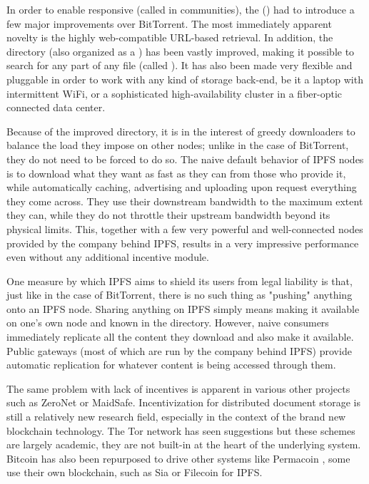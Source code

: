 In order to enable responsive  (called  in  communities), the  () \cite{ipfs2014} had to introduce a few major improvements over BitTorrent. The most immediately apparent novelty is the highly web-compatible URL-based retrieval. In addition, the directory (also organized as a ) has been vastly improved, making it possible to search for any part of any file (called ). It has also been made very flexible and pluggable in order to work with any kind of storage back-end, be it a laptop with intermittent WiFi, or a sophisticated high-availability cluster in a fiber-optic connected data center.

Because of the improved directory, it is in the interest of greedy downloaders to balance the load they impose on other nodes; unlike in the case of BitTorrent, they do not need to be forced to do so. The naive default behavior of IPFS nodes is to download what they want as fast as they can from those who provide it, while automatically caching, advertising and uploading upon request everything they come across. They use their downstream bandwidth to the maximum extent they can, while they do not throttle their upstream bandwidth beyond its physical limits. This, together with a few very powerful and well-connected nodes provided by the company behind IPFS, results in a very impressive performance even without any additional incentive module.


One measure by which IPFS aims to shield its users from legal liability is that, just like in the case of BitTorrent, there is no such thing as "pushing" anything onto an IPFS node. Sharing anything on IPFS simply means making it available on one's own node and known in the directory. However, naive consumers immediately replicate all the content they download and also make it available. Public  gateways (most of which are run by the company behind IPFS) provide automatic replication for whatever content is being accessed through them.

The same problem with lack of incentives is apparent in various other projects such as ZeroNet or MaidSafe. Incentivization for distributed document storage is still a relatively new research field, especially in the context of the brand new blockchain technology. The Tor network has seen suggestions \cite{jansen2014onions,ghoshetal2014tor} but these schemes are largely academic, they are not built-in at the heart of the underlying system. Bitcoin has also been repurposed to drive other systems like Permacoin \cite{miller2014permacoin}, some use their own blockchain, such as Sia \cite{vorick2014sia} or Filecoin \cite{filecoin2014} for IPFS.

